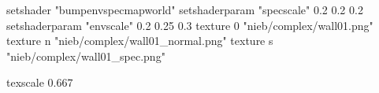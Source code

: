 setshader "bumpenvspecmapworld"
setshaderparam "specscale" 0.2 0.2 0.2
setshaderparam "envscale"  0.2 0.25 0.3
   texture 0 "nieb/complex/wall01.png"
   texture n "nieb/complex/wall01_normal.png"
   texture s "nieb/complex/wall01_spec.png"

texscale 0.667